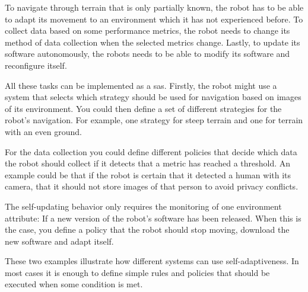 \noindent To navigate through terrain that is only partially known, the robot has to be able to adapt
its movement to an environment which it has not experienced before. 
To collect data based on some performance metrics, the robot needs to change its method
of data collection when the selected metrics change.
Lastly, to update its software autonomously, the robots needs to be able
to modify its software and reconfigure itself.

\noindent All these tasks can be implemented as a \acrshort{sas}.
Firstly, the robot might use a system that selects
which strategy should be used for navigation based on images of its environment.
You could then define a set of different strategies for the robot's navigation.
For example, one strategy for steep terrain and one for terrain with an even ground.

\noindent For the data collection you could define different policies
that decide which data the robot should collect if it detects that a metric has reached a threshold.
An example could be that if the robot is certain that it detected a human with its camera,
that it should not store images of that person to avoid privacy conflicts.

\noindent The self-updating behavior only requires the monitoring of one environment attribute:
If a new version of the robot's software has been released.
When this is the case, you define a policy that the robot should stop moving, download the new software
and adapt itself.

\noindent These two examples illustrate how different systems can use self-adaptiveness.
In most cases it is enough to define simple rules and policies that should be executed
when some condition is met.



